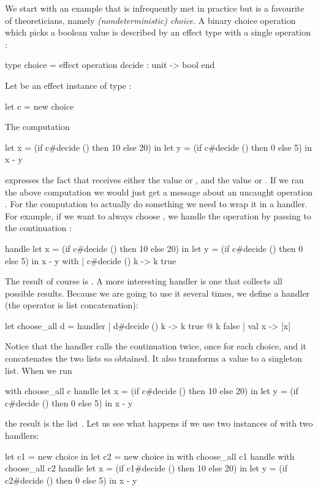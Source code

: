 We start with an example that is infrequently met in practice but is a favourite of theoreticians, namely \emph{(nondeterministic) choice}. A binary choice operation which picks a boolean value is described by an effect type with a single operation :
%
\begin{source}
type choice = effect
  operation decide : unit -> bool
end
\end{source}
%
Let  be an effect instance of type :
%
\begin{source}
let c = new choice
\end{source}
%
The computation
%
\begin{source}
let x = (if c#decide () then 10 else 20) in
let y = (if c#decide () then 0 else 5) in
  x - y
\end{source}
%
expresses the fact that  receives either the value  or , and  the value  or . If we ran the above computation we would just get a message about an uncaught operation . For the computation to actually do something we need to wrap it in a handler. For example, if we want  to always choose , we handle the operation by passing  to the continuation :
%
\begin{source}
handle
  let x = (if c#decide () then 10 else 20) in
  let y = (if c#decide () then 0 else 5) in
    x - y
with
| c#decide () k -> k true
\end{source}
%
The result of course is . A more interesting handler is one that collects all possible results. Because we are going to use it several times, we define a handler (the operator  is list concatenation):
%
\begin{source}
let choose_all d = handler
  | d#decide () k -> k true @ k false
  | val x -> [x]
\end{source}
%
Notice that the handler calls the continuation  twice, once for each choice, and it concatenates the two lists so obtained. It also transforms a value to a singleton list. When we run
%
\begin{source}
with choose_all c handle
  let x = (if c#decide () then 10 else 20) in
  let y = (if c#decide () then 0 else 5) in
    x - y
\end{source}
%
the result is the list \inline{[10;5;20;15]}.
%
Let us see what happens if we use two instances of  with two handlers:
%
\begin{source}
let c1 = new choice in
let c2 = new choice in
  with choose_all c1 handle
  with choose_all c2 handle
    let x = (if c1#decide () then 10 else 20) in
    let y = (if c2#decide () then 0 else 5) in
      x - y
\end{source}
